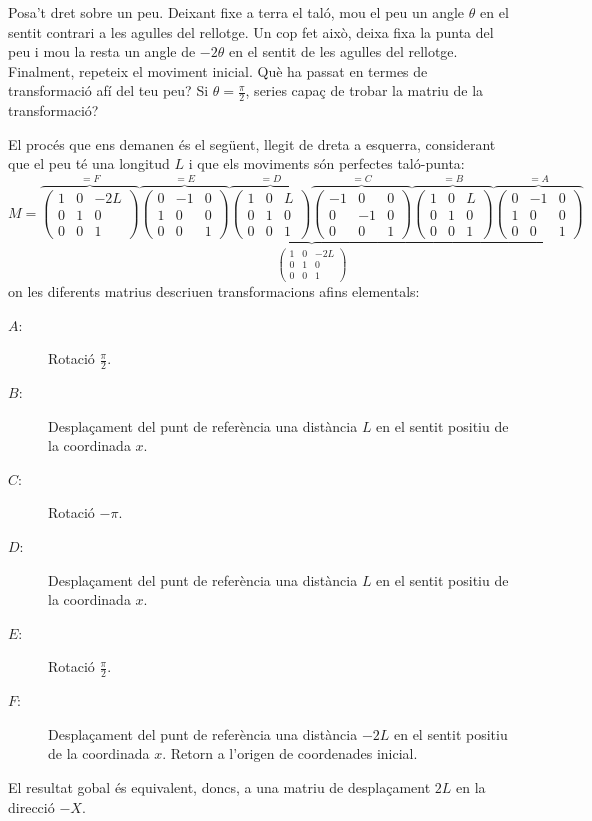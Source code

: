 \Exercise Posa’t dret sobre un peu. Deixant fixe a terra el taló, mou el peu un angle \(\theta \) en el sentit contrari a les agulles del rellotge. Un cop fet això, deixa fixa la punta del peu i mou la resta un angle de \(-2\theta \) en el sentit de les agulles del rellotge. Finalment, repeteix el moviment inicial. Què ha passat en termes de transformació afí del teu peu? Si \(\theta =\frac {\pi }{2}\), series capaç de trobar la matriu de la transformació?

\Answer El procés que ens demanen és el següent, llegit de dreta a esquerra, considerant que el peu té una longitud $L$ i que els moviments són perfectes taló-punta:
\[
  M=\underbrace{  
    \overbrace{\begin{pmatrix}1&0&-2L\\0&1&0\\0&0&1\end{pmatrix}}^{=F}
    \overbrace{\begin{pmatrix}0&-1&0\\1&0&0\\0&0&1\end{pmatrix}}^{=E}
    \overbrace{\begin{pmatrix}1&0&L\\0&1&0\\0&0&1\end{pmatrix}}^{=D}
    \overbrace{\begin{pmatrix}-1&0&0\\0&-1&0\\0&0&1\end{pmatrix}}^{=C}
    \overbrace{\begin{pmatrix}1&0&L\\0&1&0\\0&0&1\end{pmatrix}}^{=B}
    \overbrace{\begin{pmatrix}0&-1&0\\1&0&0\\0&0&1\end{pmatrix}}^{=A}
  }_{\begin {pmatrix}1&0&-2L\\0&1&0\\0&0&1 \end {pmatrix}}
\]
on les diferents matrius descriuen transformacions afins elementals:
\begin{description}
    \item[$A$: ] Rotació $\frac{\pi}{2}$.
    \item[$B$: ] Desplaçament del punt de referència una distància $L$ en el sentit positiu de la coordinada $x$.
    \item[$C$: ] Rotació $-\pi$. 
    \item[$D$: ] Desplaçament del punt de referència una distància $L$ en el sentit positiu de la coordinada $x$.
    \item[$E$: ] Rotació $\frac{\pi}{2}$.
    \item[$F$: ] Desplaçament del punt de referència una distància $-2L$ en el sentit positiu de la coordinada $x$. Retorn a l'origen de coordenades inicial.
\end{description}

El resultat gobal és equivalent, doncs, a una matriu de desplaçament \(2L\) en la direcció \(-X\).

\blacksquare
